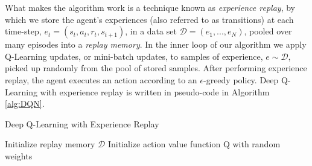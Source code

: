 \documentclass[11pt]{article}
\begin{document}
\indent What makes the algorithm work is a technique known as \textit{experience replay}\cite{schaul2015prioritized}, by which we store the agent's experiences (also referred to as transitions) at each time-step, $e_t = (s_t, a_t, r_t, s_{t+1})$, in a data set $ \mathcal{D} = (e_1, ..., e_N)$, pooled over many episodes into a \textit{replay memory}. In the inner loop of our algorithm we apply Q-Learning updates, or mini-batch updates, to samples of experience, $e \sim \mathcal{D}$, picked up randomly from the pool of stored samples. After performing experience replay, the agent executes an action according to an $\epsilon$-greedy policy. Deep Q-Learning with experience replay is written in pseudo-code in Algorithm \ref{alg:DQN}.
\begin{algorithm}[h]
	\caption{Deep Q-Learning with Experience Replay}
	\label{alg:DQN}
	\SetAlgoLined
	\DontPrintSemicolon
	Initialize replay memory $\mathcal{D}$ \;
	Initialize action value function Q with random weights \;
\end{algorithm}
\end{document}
